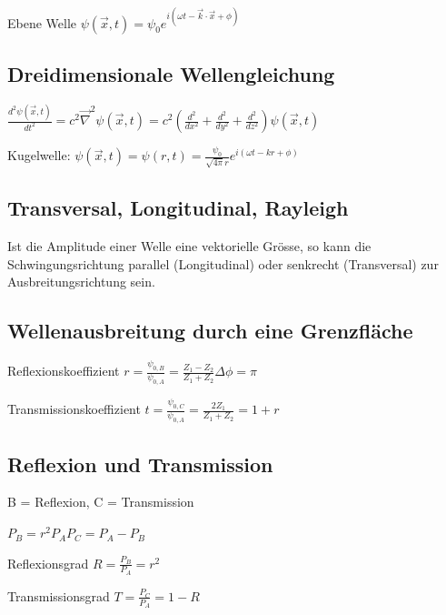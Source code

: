 \documentclass[10pt,a4paper]{scrartcl}
\begin{document}
\begin{multicols*}{3}
	Ebene Welle \hspace{1ex} $\psi(\vec{x},t)=\psi_0e^{i(\omega t-\vec{k}\cdot\vec{x}+\phi)}$
	
	\subsection*{Dreidimensionale Wellengleichung}
	
	$\frac{d^2\psi(\vec{x},t)}{dt^2}=
	c^2\vec{\nabla}^2\psi(\vec{x},t)=c^2(\frac{d^2}{dx^2}+\frac{d^2}{dy^2}+\frac{d^2}{dz^2})\psi(\vec{x},t)$
	
	Kugelwelle: $\psi(\vec{x},t)=\psi(r,t)=\frac{\psi_0}{\sqrt{4\pi}r}e^{i(\omega t-kr+\phi)}$
	
	 
	
	\subsection*{Transversal, Longitudinal, Rayleigh}
	
	Ist die Amplitude einer Welle eine vektorielle Grösse, so kann die Schwingungsrichtung parallel (Longitudinal) oder senkrecht (Transversal) zur Ausbreitungsrichtung sein.
	
	
	\subsection{Wellenausbreitung durch eine Grenzfläche}
	
	Reflexionskoeffizient \hspace{1ex}$r=\frac{\psi_{0,B}}{\psi_{0,A}}=\frac{Z_1-Z_2}{Z_1+Z_2}$\hfill$\Delta\phi=\pi$
	
	Transmissionskoeffizient \hspace{1ex}$t=\frac{\psi_{0,C}}{\psi_{0,A}}=\frac{2Z_1}{Z_1+Z_2}=1+r$
	
	\subsection{Reflexion und Transmission}
	
	B = Reflexion, C = Transmission
	
	$P_B=r^2P_A$\hfill$P_C=P_A-P_B$
	
	Reflexionsgrad $R=\frac{P_B}{P_A}=r^2$
	
	Transmissionsgrad $T=\frac{P_C}{P_A}=1-R$
		
	\vspace{1ex}	
		

\end{multicols*}
\end{document}
